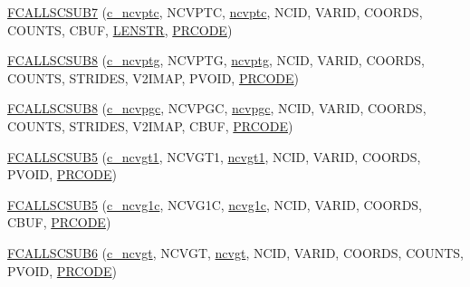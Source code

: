 \begin{DoxyCompactItemize}
\item 
\hyperlink{fort-v2compat_8c_ad88c75187e19db15b1e57408f25ff0db}{F\+C\+A\+L\+L\+S\+C\+S\+U\+B7} (\hyperlink{nf__v2compat_8c_add9961f97a96ff8a834bdc8da533ef4e}{c\+\_\+ncvptc}, N\+C\+V\+P\+TC, \hyperlink{nf__fortv2_8f90_a6c95aa587ee368266d7727735158957f}{ncvptc}, N\+C\+ID, V\+A\+R\+ID, C\+O\+O\+R\+DS, C\+O\+U\+N\+TS, C\+B\+UF, \hyperlink{fort-v2compat_8c_afcbdb4ceefc87947c1f6254df71bdb36}{L\+E\+N\+S\+TR}, \hyperlink{fort-v2compat_8c_ae2352f39cbd25bcaf1bedbbb12db73fe}{P\+R\+C\+O\+DE})
\item 
\hyperlink{fort-v2compat_8c_a4177d74ae5060c854615b1608a7af245}{F\+C\+A\+L\+L\+S\+C\+S\+U\+B8} (\hyperlink{nf__v2compat_8c_a9cf8e2715d16ffc4410f608b4ed941aa}{c\+\_\+ncvptg}, N\+C\+V\+P\+TG, \hyperlink{nf__fortv2_8f90_aacf3b20901c252480d87dc327cf6a9f5}{ncvptg}, N\+C\+ID, V\+A\+R\+ID, C\+O\+O\+R\+DS, C\+O\+U\+N\+TS, S\+T\+R\+I\+D\+ES, V2\+I\+M\+AP, P\+V\+O\+ID, \hyperlink{fort-v2compat_8c_ae2352f39cbd25bcaf1bedbbb12db73fe}{P\+R\+C\+O\+DE})
\item 
\hyperlink{fort-v2compat_8c_a44a9e409e1a63a04a605944785188ca7}{F\+C\+A\+L\+L\+S\+C\+S\+U\+B8} (\hyperlink{nf__v2compat_8c_af792c7a0a9b873fa9b56ee0f17112b99}{c\+\_\+ncvpgc}, N\+C\+V\+P\+GC, \hyperlink{nf__fortv2_8f90_ae593f10084ce6b3ed716b1dcf87d6618}{ncvpgc}, N\+C\+ID, V\+A\+R\+ID, C\+O\+O\+R\+DS, C\+O\+U\+N\+TS, S\+T\+R\+I\+D\+ES, V2\+I\+M\+AP, C\+B\+UF, \hyperlink{fort-v2compat_8c_ae2352f39cbd25bcaf1bedbbb12db73fe}{P\+R\+C\+O\+DE})
\item 
\hyperlink{fort-v2compat_8c_aef8c75bdc8a1f1c314a308850b6a181f}{F\+C\+A\+L\+L\+S\+C\+S\+U\+B5} (\hyperlink{nf__v2compat_8c_a3cfcd4ee8ba5397ab91260bc46f4ded9}{c\+\_\+ncvgt1}, N\+C\+V\+G\+T1, \hyperlink{nf__fortv2_8f90_a6c63eb6533f6fd980258f9ded00cf4e1}{ncvgt1}, N\+C\+ID, V\+A\+R\+ID, C\+O\+O\+R\+DS, P\+V\+O\+ID, \hyperlink{fort-v2compat_8c_ae2352f39cbd25bcaf1bedbbb12db73fe}{P\+R\+C\+O\+DE})
\item 
\hyperlink{fort-v2compat_8c_a2839404407c4a0e04c3444d0529c7ab8}{F\+C\+A\+L\+L\+S\+C\+S\+U\+B5} (\hyperlink{nf__v2compat_8c_a0b558cfe78f0df371d4150519b9c5650}{c\+\_\+ncvg1c}, N\+C\+V\+G1C, \hyperlink{nf__fortv2_8f90_ab8326c1d1a7aa3142428092a708f6a10}{ncvg1c}, N\+C\+ID, V\+A\+R\+ID, C\+O\+O\+R\+DS, C\+B\+UF, \hyperlink{fort-v2compat_8c_ae2352f39cbd25bcaf1bedbbb12db73fe}{P\+R\+C\+O\+DE})
\item 
\hyperlink{fort-v2compat_8c_a9a398103d54bd402c86b46616569ef30}{F\+C\+A\+L\+L\+S\+C\+S\+U\+B6} (\hyperlink{nf__v2compat_8c_ae39e340aeaf256362639b1d87d4a870b}{c\+\_\+ncvgt}, N\+C\+V\+GT, \hyperlink{nf__fortv2_8f90_a376e4bb1238c7da316b25b32d34608f7}{ncvgt}, N\+C\+ID, V\+A\+R\+ID, C\+O\+O\+R\+DS, C\+O\+U\+N\+TS, P\+V\+O\+ID, \hyperlink{fort-v2compat_8c_ae2352f39cbd25bcaf1bedbbb12db73fe}{P\+R\+C\+O\+DE})

\end{DoxyCompactItemize}
